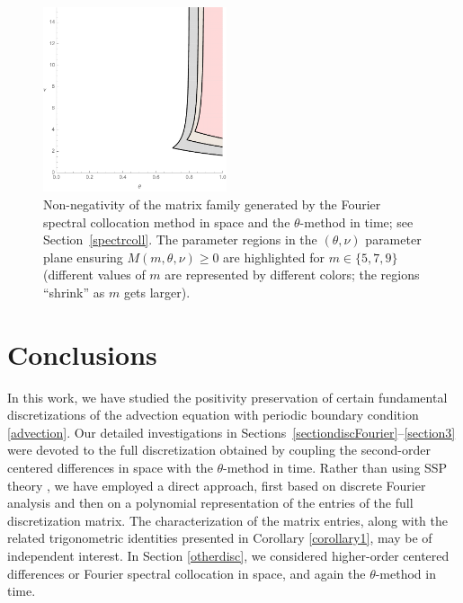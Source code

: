 \documentclass[smallextended,numbook,runningheads]{svjour3}     %
\newcommand{\te}{\theta}
\begin{document}
\begin{figure}
\begin{center}
\includegraphics[width=0.48\textwidth]{fig_spectral.pdf}
\caption{Non-negativity of the matrix family generated by the Fourier spectral collocation method in space and the $\theta$-method in time; see Section~\ref{spectrcoll}. The parameter regions in the $(\te,\nu)$ parameter plane ensuring $M(m,\te,\nu)\ge 0$ are highlighted for $m\in\{5, 7, 9\}$ (different values of $m$ are represented by different colors; the regions ``shrink'' as $m$ gets larger).}\label{fig_spectral}
\end{center}
\end{figure}


\section{Conclusions}\label{conclusions}

In this work, we have studied the positivity preservation of certain fundamental
discretizations of the advection equation with periodic boundary condition \eqref{advection}. 
Our detailed investigations in Sections~\ref{sectiondiscFourier}--\ref{section3}
were devoted to the  full discretization obtained by coupling the second-order centered
differences in space with the $\theta$-method in time.  
 Rather than using SSP theory \cite{SSPbook}, 
we have employed a direct
approach, first based on discrete Fourier analysis and then
on a polynomial representation of the entries of the full discretization matrix.
The characterization of the %
matrix entries, %
along with the related trigonometric identities
presented in Corollary \ref{corollary1}, may be of independent interest.
In Section \ref{otherdisc}, we considered higher-order centered
differences or Fourier spectral collocation in space, and again the $\theta$-method in time. 
\end{document}
